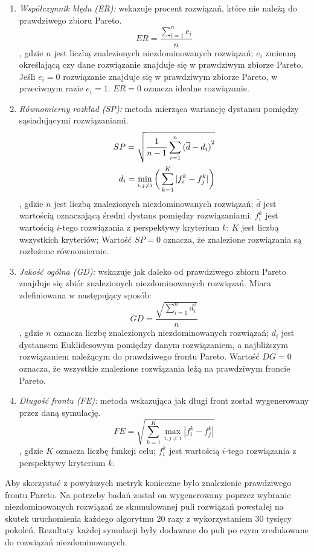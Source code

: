 \documentclass[twoside]{iisthesis}
\begin{document}
\begin{enumerate}
	\item \textit{Współczynnik błędu (ER):} wskazuje procent rozwiązań, które nie należą do prawdziwego zbioru Pareto.
	\begin{equation}
		ER = \dfrac{\sum_{i=1}^{n} e_{i}}{n}
	\end{equation}
	, gdzie $n$ jest liczbą znalezionych niezdominowanych rozwiązań; $e_{i}$ zmienną określającą czy dane rozwiązanie znajduje się w prawdziwym zbiorze Pareto. Jeśli $e_{i} = 0$ rozwiązanie znajduje się w prawdziwym zbiorze Pareto, w przeciwnym razie $e_{i} = 1$. $ER = 0$ oznacza idealne rozwiązanie.\\
	\item \textit{Równomierny rozkład (SP):} metoda mierząca wariancję dystansu pomiędzy sąsiadującymi rozwiązaniami.
	\begin{equation}
		\begin{split}
		SP = \sqrt{\dfrac{1}{n-1}\sum_{i=1}^{n}{(\overline{d} - d_{i})}^{2}}\\
		d_{i} = \min_{i,j \neq i} \bigg{(} \sum_{k=1}^{K}|f_{i}^{k} - f_{j}^{k}|\bigg{)}
		\end{split}
	\end{equation}
	, gdzie $n$ jest liczbą znalezionych niezdominowanych rozwiązań; $\overline{d}$ jest wartością oznaczającą średni dystans pomiędzy rozwiązaniami. $f_{i}^{k}$ jest wartością $i$-tego rozwiązania z perspektywy kryterium $k$; $K$ jest liczbą wszystkich kryteriów; Wartość $SP = 0$ oznacza, że znalezione rozwiązania są rozłożone równomiernie.\\
	\item \textit{Jakość ogólna (GD):}  wskazuje jak daleko od prawdziwego zbioru Pareto znajduje się zbiór znalezionych niezdominowanych rozwiązań. Miara zdefiniowana w następujący sposób:
	\begin{equation}
		GD = \dfrac{\sqrt{\sum_{i=1}^{n} d_{i}^{2}}}{n}
	\end{equation}
	, gdzie $n$ oznacza liczbę znalezionych niezdominowanych rozwiązań; $d_{i}$ jest dystansem Euklidesowym pomiędzy danym rozwiązaniem, a najbliższym rozwiązaniem należącym do prawdziwego frontu Pareto. Wartość $DG = 0$ oznacza, że wszystkie znalezione rozwiązania leżą na prawdziwym froncie Pareto.\\
	\item \textit{Długość frontu (FE):} metoda wskazująca jak długi front został wygenerowany przez daną symulację.
	\begin{equation}	
		FE = \sqrt{\sum_{k=1}^{K} \max_{i, j \neq i} |f_{i}^{k} - f_{j}^{k}|}
	\end{equation}
	, gdzie $K$ oznacza liczbę funkcji celu; $f_{i}^{k}$ jest wartością $i$-tego rozwiązania z perspektywy kryterium $k$.\\
\end{enumerate}
Aby skorzystać z powyższych metryk konieczne było znalezienie prawdziwego frontu Pareto. Na potrzeby badań został on wygenerowany poprzez wybranie niezdominowanych rozwiązań ze skumulowanej puli rozwiązań powstałej na skutek uruchomienia każdego algorytmu 20 razy z wykorzystaniem 30 tysięcy pokoleń. Rezultaty każdej symulacji były dodawane do puli po czym zredukowane do rozwiązań niezdominowanych.
\end{document}
